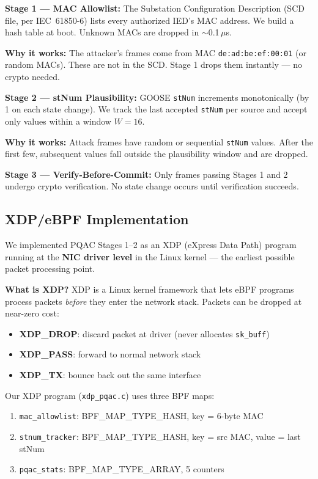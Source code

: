 \documentclass[11pt,a4paper,twocolumn]{article}
\begin{document}
\textbf{Stage 1 --- MAC Allowlist:} The Substation Configuration Description (SCD file, per IEC~61850-6) lists every authorized IED's MAC address. We build a hash table at boot. Unknown MACs are dropped in $\sim$0.1\,$\mu$s.

\textbf{Why it works:} The attacker's frames come from MAC \texttt{de:ad:be:ef:00:01} (or random MACs). These are not in the SCD. Stage 1 drops them instantly --- no crypto needed.

\textbf{Stage 2 --- stNum Plausibility:} GOOSE \texttt{stNum} increments monotonically (by 1 on each state change). We track the last accepted \texttt{stNum} per source and accept only values within a window $W = 16$.

\textbf{Why it works:} Attack frames have random or sequential \texttt{stNum} values. After the first few, subsequent values fall outside the plausibility window and are dropped.

\textbf{Stage 3 --- Verify-Before-Commit:} Only frames passing Stages 1 and 2 undergo crypto verification. No state change occurs until verification succeeds.

\subsection{XDP/eBPF Implementation}

We implemented PQAC Stages 1--2 as an XDP (eXpress Data Path) program running at the \textbf{NIC driver level} in the Linux kernel --- the earliest possible packet processing point.

\textbf{What is XDP?} XDP is a Linux kernel framework that lets eBPF programs process packets \emph{before} they enter the network stack. Packets can be dropped at near-zero cost:

\begin{itemize}[leftmargin=1.5em,itemsep=1pt]
\item \textbf{XDP\_DROP}: discard packet at driver (never allocates \texttt{sk\_buff})
\item \textbf{XDP\_PASS}: forward to normal network stack
\item \textbf{XDP\_TX}: bounce back out the same interface
\end{itemize}

Our XDP program (\texttt{xdp\_pqac.c}) uses three BPF maps:
\begin{enumerate}[leftmargin=1.5em,itemsep=1pt]
\item \texttt{mac\_allowlist}: BPF\_MAP\_TYPE\_HASH, key = 6-byte MAC
\item \texttt{stnum\_tracker}: BPF\_MAP\_TYPE\_HASH, key = src MAC, value = last stNum
\item \texttt{pqac\_stats}: BPF\_MAP\_TYPE\_ARRAY, 5 counters
\end{enumerate}
\end{document}
